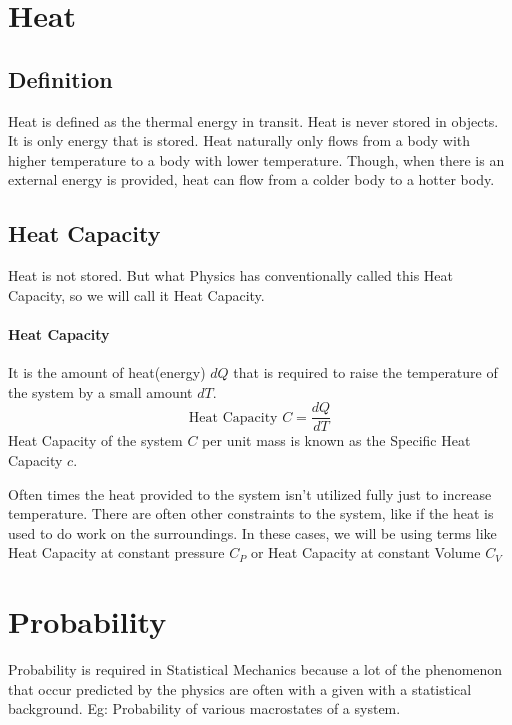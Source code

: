 \documentclass[12pt, oneside]{book}
\begin{document}
\section{Heat}
\subsection{Definition}
Heat is defined as the thermal energy in transit.
Heat is never stored in objects.
It is only energy that is stored.
Heat naturally only flows from a body with higher temperature to a body with lower temperature.
Though, when there is an external energy is provided, heat can flow from a colder body to a hotter body.
\subsection{Heat Capacity}
Heat is not stored.
But what Physics has conventionally called this Heat Capacity, so we will call it Heat Capacity.
\paragraph{Heat Capacity} It is the amount of heat(energy) \(dQ\) that is required to raise the temperature of the system by a small amount \(dT\).
\[\text{Heat Capacity }C = \frac{dQ}{dT} \]
Heat Capacity of the system \(C\) per unit mass is known as the Specific Heat Capacity \(c\).

Often times the heat provided to the system isn't utilized fully just to increase temperature.
There are often other constraints to the system, like if the heat is used to do work on the surroundings.
In these cases, we will be using terms like Heat Capacity at constant pressure \(C_P\) or Heat Capacity at constant Volume \(C_V\)

\section{Probability}
Probability is required in Statistical Mechanics because a lot of the phenomenon that occur predicted by the physics are often with a given with a statistical background.
Eg: Probability of various macrostates of a system.
\end{document}
